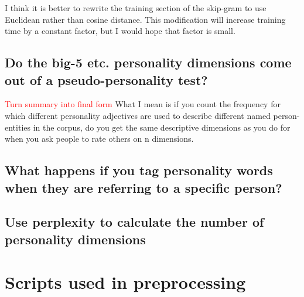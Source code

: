 \documentclass[10pt,letterpaper]{book}
\newcommand{\todo}[1]{\textcolor{red}{#1}}
\begin{document}
I think it is better to rewrite the training section of the skip-gram to use Euclidean rather than cosine distance. This modification will increase training time by a constant factor, but I would hope that factor is small.

\section{Do the big-5 etc. personality dimensions come out of a pseudo-personality test?}
\todo{Turn summary into final form}
What I mean is if you count the frequency for which different personality adjectives are used to describe different named person-entities in the corpus, do you get the same descriptive dimensions as you do for when you ask people to rate others on n dimensions.

\section{What happens if you tag personality words when they are referring to a specific person?}

\section{Use perplexity to calculate the number of personality dimensions}

\appendix
\chapter{Scripts used in preprocessing}
\end{document}
